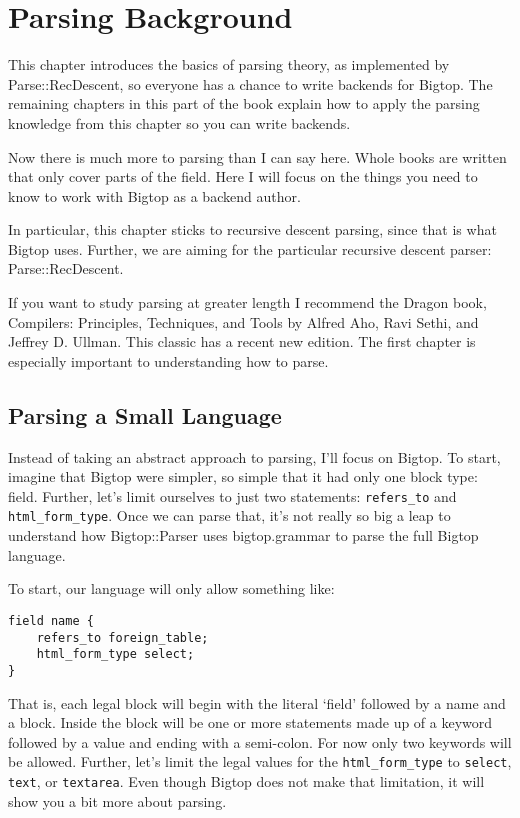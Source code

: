 \chapter{Parsing Background}
\label{chap:parsing}

This chapter introduces the basics of parsing theory, as implemented by
Parse::RecDescent, so everyone has a chance to write backends for
Bigtop.  The remaining chapters in this part of the book explain
how to apply the parsing knowledge from this chapter so you can write
backends.

Now there is much more to parsing than I can say here.  Whole books are
written that only cover parts of the field.  Here I will focus on the
things you need to know to work with Bigtop as a backend author.

In particular, this chapter sticks to recursive descent parsing, since
that is what Bigtop uses.  Further, we are aiming for the particular
recursive descent parser: Parse::RecDescent.

If you want to study parsing at greater length I recommend the Dragon book,
Compilers: Principles, Techniques, and Tools by Alfred Aho, Ravi Sethi, and
Jeffrey D. Ullman.  This classic has a recent new edition.  The first chapter
is especially important to understanding how to parse.

\section{Parsing a Small Language}

Instead of taking an abstract approach to parsing, I'll focus on Bigtop.
To start, imagine that Bigtop were simpler, so simple that it had only one
block type: field.  Further, let's limit ourselves to just two statements:
\verb+refers_to+ and \verb+html_form_type+.  Once we can parse that, it's
not really so big a leap to understand how Bigtop::Parser uses
bigtop.grammar to parse the full Bigtop language.

To start, our language will only allow something like:

\begin{verbatim}
field name {
    refers_to foreign_table;
    html_form_type select;
}
\end{verbatim}

That is, each legal block will begin with the literal `field' followed
by a name and a block.  Inside the block will be one or more statements
made up of a keyword followed by a value and ending with a semi-colon.
For now only two keywords will be allowed.  Further, let's limit the
legal values for the \verb+html_form_type+ to \verb+select+, \verb+text+,
or \verb+textarea+.  Even though Bigtop does not make that limitation,
it will show you a bit more about parsing.

